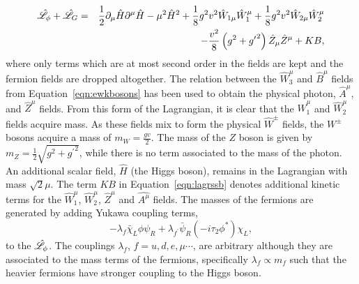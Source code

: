 \begin{eqnarray}
\hat{\mathscr{L}}_{\phi}+\hat{\mathscr{L}}_{G} 
	     & = &   \frac{1}{2} \partial_{\mu} \hat{H} \partial^{\mu} \hat{H} 
	     - \mu^{2} \hat{H}^{2} 
	     + \frac{1}{8} g^{2}v^{2}\hat{W}_{1\mu}\hat{W}_{1}^{\mu}
	     + \frac{1}{8} g^{2}v^{2}\hat{W}_{2\mu}\hat{W}_{2}^{\mu}	
\nonumber \\
	    & & - \frac{v^{2}}{8} \left(g^{2}+{g^{\prime}}^{2}\right)\hat{Z}_{\mu}\hat{Z}^{\mu}
	     + KB ,
\label{eqn:lagrssb}
\end{eqnarray}
where only terms which are at most second order in the fields are kept and the 
fermion fields are dropped altogether. 
The relation between the $\hat{W}^{\mu}_{3}$ 
and $\hat{B}^{\mu}$ fields from Equation~\ref{eqn:ewkbosons} has been used to obtain
the physical photon, $\hat{A}^{\mu}$, and $\hat{Z}^{\mu}$ 
fields. 
From this form of the Lagrangian, it is clear that the $\hat{W}_{1}^{\mu}$ and 
$\hat{W}^{\mu}_{2}$ fields acquire mass. As these fields
mix to form the physical $\hat{W}^{\pm}$ fields, the $W^{\pm}$ bosons acquire a mass
of $m_{W} = \frac{\displaystyle gv}{\displaystyle 2}$.
The mass of the $Z$ boson is given by 
$m_{Z}=\frac{\displaystyle 1}{\displaystyle 2}\sqrt{g^{2}+{g^{\prime}}^{2}}$, 
while there is no term associated to the mass of the photon.
An additional scalar field, $\hat{H}$ (the Higgs boson), 
remains in the Lagrangian with mass $\sqrt{2}\mu$. 
The term $KB$ in Equation~\ref{eqn:lagrssb} denotes additional kinetic terms for the $\hat{W}^{\mu}_{1}$, 
$\hat{W}^{\mu}_{2}$, $\hat{Z}^{\mu}$ and $\hat{A^{\mu}}$ fields. 
The masses of the fermions are generated by adding Yukawa coupling
terms,
\begin{equation} 
-\lambda_{f} \bar{\chi}_{L} \phi \psi_{R} + \lambda_{f^{\prime}}\bar{\psi}_{R}(-i\tau_{2}\phi^{*})\chi_{L},
\end{equation}
to the $\hat{\mathscr{L}}_{\phi}$. The couplings $\lambda_{f}$, $f=u,d,e,\mu\cdots$, 
are arbitrary although they are
associated to the mass terms of the fermions, specifically 
$\lambda_{f}\propto m_{f}$ such that the heavier fermions have stronger
coupling to the Higgs boson. 

